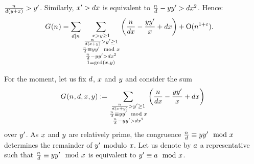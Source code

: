   $\frac{n_{}}{d(y+x)}>y'$.  Similarly,
  $x'>dx$ is equivalent to
  $\frac{n_{}}{d}-yy' > dx^2$.
  Hence:
  \begin{align*}
    \TheQuantityOf{\Size}
    &=
      \Sum[\TheDivisor\divides\Size]{
        \Sum[\substack{
          \LeftA > \RightA \geq 1 \\
          \frac{\Size}{\TheDivisor(\LeftA+\RightA)}>\RightB \geq 1 \\
          \frac{\Size}{\TheDivisor} \congruent \RightA\RightB \mod \LeftA \\
          \frac{\Size}{\TheDivisor}-\RightA\RightB > \TheDivisor\LeftA^2 \\
          1=\gcdOf{\LeftA,\RightA}
        }]{
          \Parens{\frac{\Size}{\TheDivisor\LeftA} -\frac{\RightA\RightB}{\LeftA}+\TheDivisor\LeftA}
        }
      }
      +
    \BigO{\Size^{1 + \TheEpsilon}}
    .
  \end{align*}

  For the moment, let us fix $d$, $x$ and $y$ and
  consider the sum
  \[
    \TheQuantityOf{\Size,\TheDivisor,\LeftA,\RightA}
    :=
    \Sum[\substack{
      \frac{\Size}{\TheDivisor(\LeftA+\RightA)}>\RightB \geq 1 \\
      \frac{\Size}{\TheDivisor} \congruent \RightA\RightB \mod \LeftA \\
      \frac{\Size}{\TheDivisor}-\RightA\RightB > \TheDivisor\LeftA^2 \\
    }]{
      \Parens{
        \frac{\Size}{\TheDivisor\LeftA}
        -
        \frac{\RightA\RightB}{\LeftA}+\TheDivisor\LeftA
      }
    }
  \]    
  over $y'$. As $x$ and $y$ are relatively prime, the
  congruence $\frac{n_{}}{d} \equiv yy' \mod
  {x}$ determines the remainder of $y'$ modulo $x$. Let us
  denote by $a$ a representative such that
  $\frac{n_{}}{d} \equiv yy' \mod {x}$ is
  equivalent to $y' \equiv a \mod {x}$.
  
